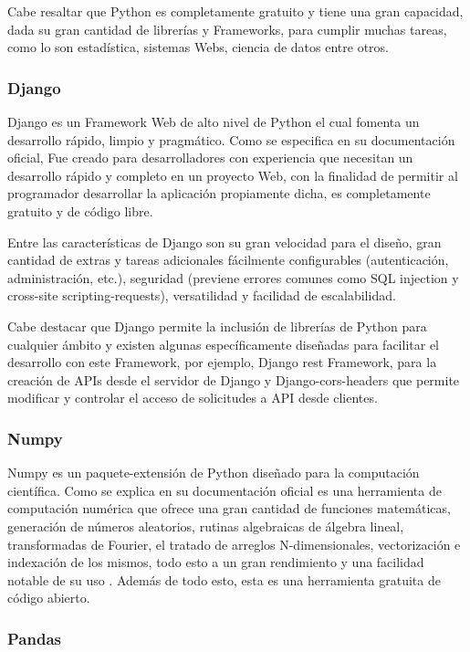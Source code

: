 Cabe resaltar que Python es completamente gratuito y tiene una gran capacidad,
dada su gran cantidad de librerías y Frameworks, para cumplir muchas tareas,
como lo son estadística, sistemas Webs, ciencia de datos entre otros.

\subsubsection{Django}

Django es un Framework Web de alto nivel de Python el cual fomenta un
desarrollo rápido, limpio y pragmático. Como se especifica en su documentación
oficial,
\textcite{DjangoDoc} Fue creado para desarrolladores con experiencia que necesitan
un desarrollo rápido y completo en un proyecto Web, con la finalidad de
permitir al programador desarrollar la aplicación propiamente dicha, es
completamente gratuito y de código libre.

Entre las características de Django son su gran velocidad para el diseño, gran
cantidad de extras y tareas adicionales fácilmente configurables
(autenticación, administración, etc.), seguridad (previene errores comunes
como SQL injection y  cross-site scripting-requests), versatilidad y facilidad
de escalabilidad.

Cabe destacar que Django permite la inclusión de librerías de Python para
cualquier ámbito y existen algunas específicamente diseñadas para facilitar el
desarrollo con este Framework, por ejemplo, Django rest Framework, para la
creación de APIs desde el servidor de Django  y Django-cors-headers que permite
modificar y controlar el acceso de solicitudes a API desde clientes.

\subsubsection{Numpy}

Numpy es un paquete-extensión de Python diseñado para la computación
científica. Como se explica en su documentación oficial \textcite{Numpy} es una
herramienta de computación numérica que ofrece una gran cantidad de  funciones
matemáticas, generación de números aleatorios, rutinas algebraicas de álgebra
lineal, transformadas de Fourier, el tratado de arreglos N-dimensionales,
vectorización e indexación de los mismos, todo esto a un gran rendimiento y una
facilidad notable de su uso . Además de todo esto, esta es una herramienta
gratuita de código abierto.

\subsubsection{Pandas}

